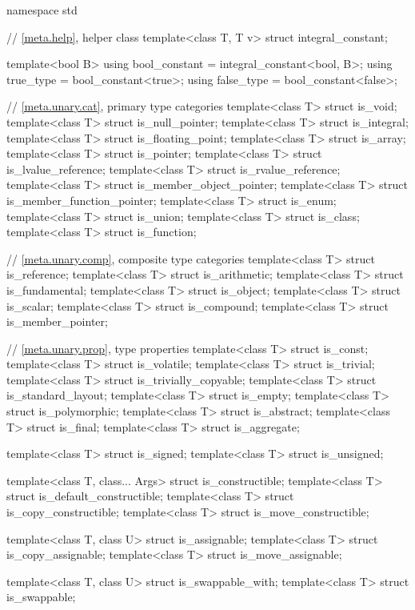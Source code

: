 %
\begin{codeblock}
namespace std {
  // \ref{meta.help}, helper class
  template<class T, T v> struct integral_constant;

  template<bool B>
    using bool_constant = integral_constant<bool, B>;
  using true_type  = bool_constant<true>;
  using false_type = bool_constant<false>;

  // \ref{meta.unary.cat}, primary type categories
  template<class T> struct is_void;
  template<class T> struct is_null_pointer;
  template<class T> struct is_integral;
  template<class T> struct is_floating_point;
  template<class T> struct is_array;
  template<class T> struct is_pointer;
  template<class T> struct is_lvalue_reference;
  template<class T> struct is_rvalue_reference;
  template<class T> struct is_member_object_pointer;
  template<class T> struct is_member_function_pointer;
  template<class T> struct is_enum;
  template<class T> struct is_union;
  template<class T> struct is_class;
  template<class T> struct is_function;

  // \ref{meta.unary.comp}, composite type categories
  template<class T> struct is_reference;
  template<class T> struct is_arithmetic;
  template<class T> struct is_fundamental;
  template<class T> struct is_object;
  template<class T> struct is_scalar;
  template<class T> struct is_compound;
  template<class T> struct is_member_pointer;

  // \ref{meta.unary.prop}, type properties
  template<class T> struct is_const;
  template<class T> struct is_volatile;
  template<class T> struct is_trivial;
  template<class T> struct is_trivially_copyable;
  template<class T> struct is_standard_layout;
  template<class T> struct is_empty;
  template<class T> struct is_polymorphic;
  template<class T> struct is_abstract;
  template<class T> struct is_final;
  template<class T> struct is_aggregate;

  template<class T> struct is_signed;
  template<class T> struct is_unsigned;

  template<class T, class... Args> struct is_constructible;
  template<class T> struct is_default_constructible;
  template<class T> struct is_copy_constructible;
  template<class T> struct is_move_constructible;

  template<class T, class U> struct is_assignable;
  template<class T> struct is_copy_assignable;
  template<class T> struct is_move_assignable;

  template<class T, class U> struct is_swappable_with;
  template<class T> struct is_swappable;

}
\end{codeblock}
